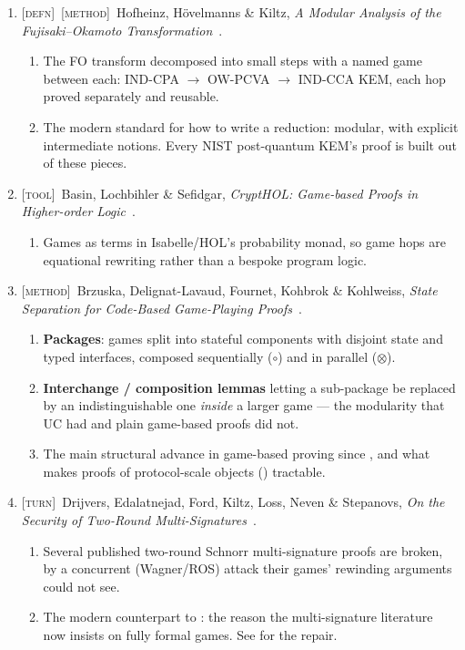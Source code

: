 \documentclass[11pt]{article}
\newcommand{\kind}[1]{{\footnotesize\textsc{\textcolor{yearcolor}{[#1]}}}\ }
\newcommand{\defn}{\kind{defn}}
\newcommand{\method}{\kind{method}}
\newcommand{\tool}{\kind{tool}}
\newcommand{\turn}{\kind{turn}}
\newcommand{\paper}[3]{#1, \emph{#2}~\cite{#3}.}
\begin{document}
\begin{enumerate}
  \item \defn\method \paper{Hofheinz, Hövelmanns \& Kiltz}{A Modular Analysis of
    the Fujisaki--Okamoto Transformation}{HHK17}
    \begin{enumerate}
      \item The FO transform decomposed into small steps with a named game
        between each: IND-CPA $\to$ OW-PCVA $\to$ IND-CCA KEM, each hop proved
        separately and reusable.
      \item The modern standard for how to write a reduction: modular, with
        explicit intermediate notions. Every NIST post-quantum KEM's proof is
        built out of these pieces.
    \end{enumerate}

  \item \tool \paper{Basin, Lochbihler \& Sefidgar}{CryptHOL: Game-based Proofs
    in Higher-order Logic}{CryptHOL17}
    \begin{enumerate}
      \item Games as terms in Isabelle/HOL's probability monad, so game hops are
        equational rewriting rather than a bespoke program logic.
    \end{enumerate}

  \item \method \paper{Brzuska, Delignat-Lavaud, Fournet, Kohbrok \& Kohlweiss}
    {State Separation for Code-Based Game-Playing Proofs}{SSP18}
    \begin{enumerate}
      \item \textbf{Packages}: games split into stateful components with
        disjoint state and typed interfaces, composed sequentially ($\circ$) and
        in parallel ($\otimes$).
      \item \textbf{Interchange / composition lemmas} letting a sub-package be
        replaced by an indistinguishable one \emph{inside} a larger game ---
        the modularity that UC had and plain game-based proofs did not.
      \item The main structural advance in game-based proving since
        \cite{BR04}, and what makes proofs of protocol-scale objects
        (\cite{BDEFKK22}) tractable.
    \end{enumerate}

  \item \turn \paper{Drijvers, Edalatnejad, Ford, Kiltz, Loss, Neven \&
    Stepanovs}{On the Security of Two-Round Multi-Signatures}{DEFKLNS19}
    \begin{enumerate}
      \item Several published two-round Schnorr multi-signature proofs are
        broken, by a concurrent (Wagner/ROS) attack their games' rewinding
        arguments could not see.
      \item The modern counterpart to \cite{Shou01}: the reason the
        multi-signature literature now insists on fully formal games. See
        \cite{NRS21} for the repair.
    \end{enumerate}


\end{enumerate}
\end{document}
